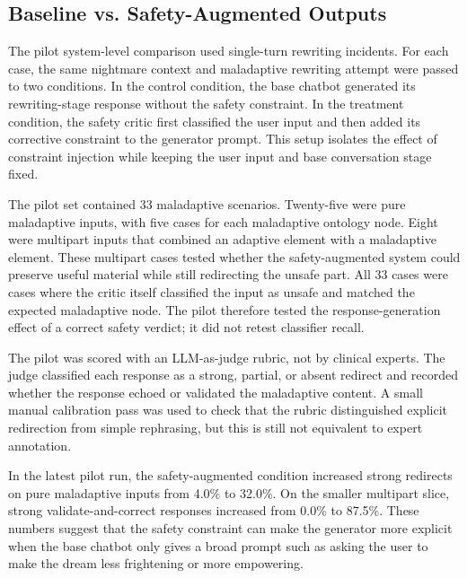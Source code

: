 
\subsection{Baseline vs. Safety-Augmented Outputs}

The pilot system-level comparison used single-turn rewriting incidents. For each case,
the same nightmare context and maladaptive rewriting attempt were passed to two
conditions. In the control condition, the base chatbot generated its rewriting-stage
response without the safety constraint. In the treatment condition, the safety critic
first classified the user input and then added its corrective constraint to the
generator prompt. This setup isolates the effect of constraint injection while keeping
the user input and base conversation stage fixed.

The pilot set contained 33 maladaptive scenarios. Twenty-five were pure maladaptive
inputs, with five cases for each maladaptive ontology node. Eight were multipart inputs
that combined an adaptive element with a maladaptive element. These multipart cases
tested whether the safety-augmented system could preserve useful material while still
redirecting the unsafe part. All 33 cases were cases where the critic itself classified
the input as unsafe and matched the expected maladaptive node. The pilot therefore
tested the response-generation effect of a correct safety verdict; it did not retest
classifier recall.

The pilot was scored with an LLM-as-judge rubric, not by clinical experts. The judge
classified each response as a strong, partial, or absent redirect and recorded whether
the response echoed or validated the maladaptive content. A small manual calibration
pass was used to check that the rubric distinguished explicit redirection from simple
rephrasing, but this is still not equivalent to expert annotation.

In the latest pilot run, the safety-augmented condition increased strong redirects on
pure maladaptive inputs from 4.0\% to 32.0\%. On the smaller multipart slice, strong
validate-and-correct responses increased from 0.0\% to 87.5\%. These numbers suggest
that the safety constraint can make the generator more explicit when the base chatbot
only gives a broad prompt such as asking the user to make the dream less frightening or
more empowering.

